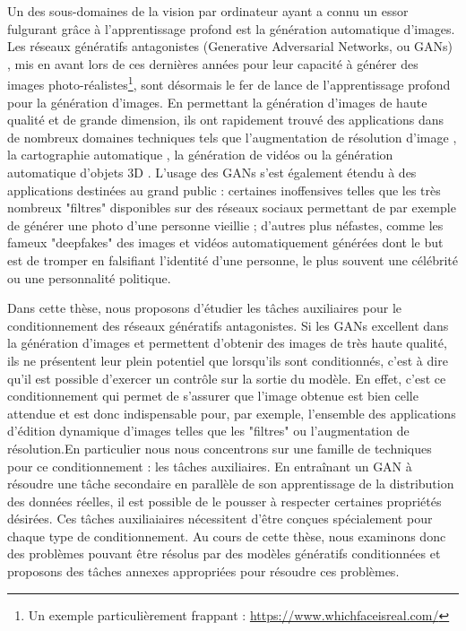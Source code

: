 {Un des sous-domaines de la vision par ordinateur ayant a connu un essor fulgurant grâce à l'apprentissage profond est la génération automatique d'images. Les réseaux génératifs antagonistes (Generative Adversarial Networks, ou \ac{GANs}) \citep{Goodfellow2014}, mis en avant lors de ces dernières années pour leur capacité à générer des images photo-réalistes\footnote{Un exemple particulièrement frappant : \url{https://www.whichfaceisreal.com/}}, sont désormais le fer de lance de l'apprentissage profond pour la génération d'images. En permettant la génération d'images de haute qualité et de grande dimension, ils ont rapidement trouvé des applications dans de nombreux domaines techniques tels que l'augmentation de résolution d'image \citep{Wang2020}, la cartographie automatique \citep{Kang2019}, la génération de vidéos \citep{Vondrick2016} ou la génération automatique d'objets 3D \citep{Wu2017}. L'usage des \ac{GANs} s'est également étendu à des applications destinées au grand public : certaines inoffensives telles que les très nombreux "filtres" disponibles sur des réseaux sociaux permettant de par exemple de générer une photo d'une personne vieillie \citep{Antipov2017a}; d'autres plus néfastes, comme les fameux "deepfakes" \citep{Vaccari2020} des images et vidéos automatiquement générées dont le but est de tromper en falsifiant l'identité d'une personne, le plus souvent une célébrité ou une personnalité politique.

Dans cette thèse, nous proposons d'étudier les tâches auxiliaires pour le conditionnement des réseaux génératifs antagonistes. Si les \ac{GANs} excellent dans la génération d'images et permettent d'obtenir des images de très haute qualité, ils ne présentent leur plein potentiel que lorsqu'ils sont conditionnés, c'est à dire  qu'il est possible d'exercer un contrôle sur la sortie du modèle. En effet, c'est ce conditionnement qui permet de s'assurer que l'image obtenue est bien celle attendue et est donc indispensable pour, par exemple, l'ensemble des applications d'édition dynamique d'images telles que les "filtres"  ou l'augmentation de résolution.En particulier nous nous concentrons sur une famille de techniques pour ce conditionnement : les tâches auxiliaires. En entraînant un \ac{GAN} à résoudre une tâche secondaire en parallèle de son apprentissage de la distribution des données réelles, il est possible de le pousser à respecter certaines propriétés désirées. Ces tâches auxiliaiaires nécessitent d'être conçues spécialement pour chaque type de conditionnement. Au cours de cette thèse, nous examinons donc des problèmes pouvant être résolus par des modèles génératifs conditionnées et proposons des tâches annexes appropriées pour résoudre ces problèmes.


}

